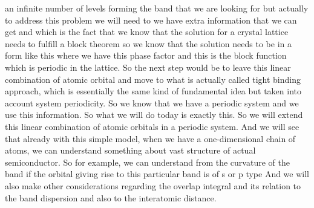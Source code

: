 an infinite number of levels forming the band that we are looking for but actually to address this problem we will need to we have extra information that we can get and which is the fact that we know that the solution for a crystal lattice needs to fulfill a block theorem so we know that the solution needs to be in a form like this where we have this phase factor and this is the block function which is periodic in the lattice. So the next step would be to leave this linear combination of atomic orbital and move to what is actually called tight binding approach, which is essentially the same kind of fundamental idea but taken into account system periodicity. So we know that we have a periodic system and we use this information. So what we will do today is exactly this. So we will extend this linear combination of atomic orbitals in a periodic system. And we will see that already with this simple model, when we have a one-dimensional chain of atoms, we can understand something about vast structure of actual semiconductor. So for example, we can understand from the curvature of the band if the orbital giving rise to this particular band is of s or p type And we will also make other considerations regarding the overlap integral and its relation to the band dispersion and also to the interatomic distance.
